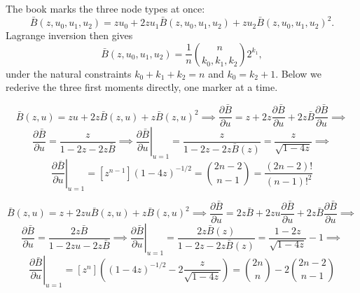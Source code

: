 The book marks the three node types at once:
\begin{equation*}
    \bar{B}(z,u_0,u_1,u_2)
        = zu_0 + 2zu_1\bar{B}(z,u_0,u_1,u_2)
            + zu_2\bar{B}(z,u_0,u_1,u_2)^2.
\end{equation*}
Lagrange inversion then gives
\begin{equation*}
    [z^n u_0^{k_0}u_1^{k_1}u_2^{k_2}]\bar{B}(z,u_0,u_1,u_2)
    =
    \frac{1}{n}\binom{n}{k_0,k_1,k_2}2^{k_1},
\end{equation*}
under the natural constraints $k_0+k_1+k_2=n$ and $k_0=k_2+1$. Below we rederive the
three first moments directly, one marker at a time.

\begin{equation*}
    \bar{B}(z, u) = zu + 2z\bar{B}(z, u) + z\bar{B}(z, u)^{2} \implies
        \frac{\partial \bar{B}}{\partial u} = z + 2z \frac{\partial \bar{B}}{\partial u} + 2z\bar{B} \frac{\partial \bar{B}}{\partial u} \implies
\end{equation*}
\begin{equation*}
    \frac{\partial \bar{B}}{\partial u} = \frac{z}{1 - 2z - 2z\bar{B}} \implies
        \left.\frac{\partial \bar{B}}{\partial u}\right|_{u = 1} = \frac{z}{1 - 2z - 2z\bar{B}(z)} = \frac{z}{\sqrt{1 - 4z}} \implies
\end{equation*}
\begin{equation*}
    [z^{n}] \left.\frac{\partial \bar{B}}{\partial u}\right|_{u = 1} = [z^{n - 1}] (1 - 4z)^{-1/2} = \binom{2n - 2}{n - 1} = \frac{(2n - 2)!}{(n - 1)!^{2}}
\end{equation*}

\begin{equation*}
    \bar{B}(z, u) = z + 2zu\bar{B}(z, u) + z\bar{B}(z, u)^{2} \implies
        \frac{\partial \bar{B}}{\partial u} = 2z\bar{B} + 2zu \frac{\partial \bar{B}}{\partial u} + 2z\bar{B} \frac{\partial \bar{B}}{\partial u} \implies
\end{equation*}
\begin{equation*}
    \frac{\partial \bar{B}}{\partial u} = \frac{2z\bar{B}}{1 - 2zu - 2z\bar{B}} \implies
        \left.\frac{\partial \bar{B}}{\partial u}\right|_{u = 1} = \frac{2z\bar{B}(z)}{1 - 2z - 2z\bar{B}(z)} = \frac{1 - 2z}{\sqrt{1 - 4z}} - 1 \implies
\end{equation*}
\begin{equation*}
    [z^{n}] \left.\frac{\partial \bar{B}}{\partial u}\right|_{u = 1} = [z^{n}] \left((1 - 4z)^{-1/2} - 2 \frac{z}{\sqrt{1 - 4z}}\right)
        = \binom{2n}{n} - 2 \binom{2n - 2}{n - 1}
\end{equation*}

